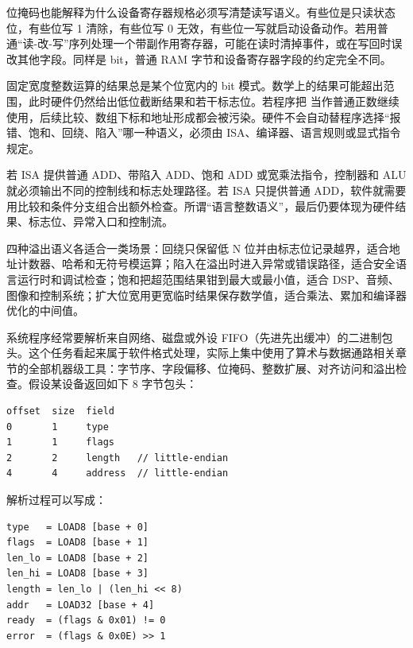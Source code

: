 位掩码也能解释为什么设备寄存器规格必须写清楚读写语义。有些位是只读状态位，有些位写 1 清除，有些位写 0 无效，有些位一写就启动设备动作。若用普通“读-改-写”序列处理一个带副作用寄存器，可能在读时清掉事件，或在写回时误改其他字段。同样是 bit，普通 RAM 字节和设备寄存器字段的约定完全不同。

固定宽度整数运算的结果总是某个位宽内的 bit 模式。数学上的结果可能超出范围，此时硬件仍然给出低位截断结果和若干标志位。若程序把  当作普通正数继续使用，后续比较、数组下标和地址形成都会被污染。硬件不会自动替程序选择“报错、饱和、回绕、陷入”哪一种语义，必须由 ISA、编译器、语言规则或显式指令规定。

若 ISA 提供普通 ADD、带陷入 ADD、饱和 ADD 或宽乘法指令，控制器和 ALU 就必须输出不同的控制线和标志处理路径。若 ISA 只提供普通 ADD，软件就需要用比较和条件分支组合出额外检查。所谓“语言整数语义”，最后仍要体现为硬件结果、标志位、异常入口和控制流。

四种溢出语义各适合一类场景：回绕只保留低 N 位并由标志位记录越界，适合地址计数器、哈希和无符号模运算；陷入在溢出时进入异常或错误路径，适合安全语言运行时和调试检查；饱和把超范围结果钳到最大或最小值，适合 DSP、音频、图像和控制系统；扩大位宽用更宽临时结果保存数学值，适合乘法、累加和编译器优化的中间值。

系统程序经常要解析来自网络、磁盘或外设 FIFO（先进先出缓冲）的二进制包头。这个任务看起来属于软件格式处理，实际上集中使用了算术与数据通路相关章节的全部机器级工具：字节序、字段偏移、位掩码、整数扩展、对齐访问和溢出检查。假设某设备返回如下 8 字节包头：

\begin{lstlisting}
offset  size  field
0       1     type
1       1     flags
2       2     length   // little-endian
4       4     address  // little-endian
\end{lstlisting}

解析过程可以写成：

\begin{lstlisting}
type   = LOAD8 [base + 0]
flags  = LOAD8 [base + 1]
len_lo = LOAD8 [base + 2]
len_hi = LOAD8 [base + 3]
length = len_lo | (len_hi << 8)
addr   = LOAD32 [base + 4]
ready  = (flags & 0x01) != 0
error  = (flags & 0x0E) >> 1
\end{lstlisting}

